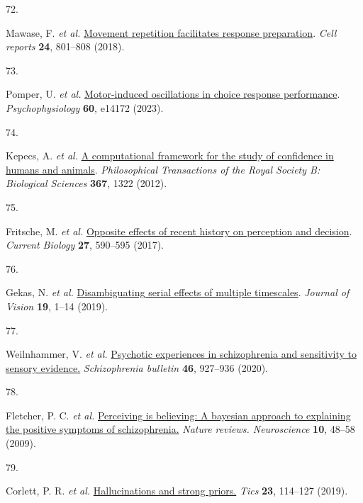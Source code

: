 \documentclass[
]{article}
\newlength{\cslhangindent}
\newlength{\csllabelwidth}
\newlength{\cslentryspacingunit} %
\newenvironment{CSLReferences}[2] %
 {%
  \setlength{\parindent}{0pt}
  \ifodd #1
  \let\oldpar\par
  \def\par{\hangindent=\cslhangindent\oldpar}
  \fi
  \setlength{\parskip}{#2\cslentryspacingunit}
 }%
 {}
\newcommand{\CSLLeftMargin}[1]{\parbox[t]{\csllabelwidth}{#1}}
\newcommand{\CSLRightInline}[1]{\parbox[t]{\linewidth - \csllabelwidth}{#1}\break}
\begin{document}
\begin{CSLReferences}{0}{0}
\leavevmode{}%
\CSLLeftMargin{72. }%
\CSLRightInline{Mawase, F. \emph{et al.}
\href{https://doi.org/10.1016/J.CELREP.2018.06.097}{Movement repetition
facilitates response preparation}. \emph{Cell reports} \textbf{24},
801--808 (2018).}

\leavevmode{}%
\CSLLeftMargin{73. }%
\CSLRightInline{Pomper, U. \emph{et al.}
\href{https://doi.org/10.1111/PSYP.14172}{Motor-induced oscillations in
choice response performance}. \emph{Psychophysiology} \textbf{60},
e14172 (2023).}

\leavevmode{}%
\CSLLeftMargin{74. }%
\CSLRightInline{Kepecs, A. \emph{et al.}
\href{https://doi.org/10.1098/RSTB.2012.0037}{A computational framework
for the study of confidence in humans and animals}. \emph{Philosophical
Transactions of the Royal Society B: Biological Sciences} \textbf{367},
1322 (2012).}

\leavevmode{}%
\CSLLeftMargin{75. }%
\CSLRightInline{Fritsche, M. \emph{et al.}
\href{https://doi.org/10.1016/j.cub.2017.01.006}{Opposite effects of
recent history on perception and decision}. \emph{Current Biology}
\textbf{27}, 590--595 (2017).}

\leavevmode{}%
\CSLLeftMargin{76. }%
\CSLRightInline{Gekas, N. \emph{et al.}
\href{https://doi.org/10.1167/19.6.24}{Disambiguating serial effects of
multiple timescales}. \emph{Journal of Vision} \textbf{19}, 1--14
(2019).}

\leavevmode{}%
\CSLLeftMargin{77. }%
\CSLRightInline{Weilnhammer, V. \emph{et al.}
\href{https://www.ncbi.nlm.nih.gov/pubmed/32090246}{Psychotic
experiences in schizophrenia and sensitivity to sensory evidence.}
\emph{Schizophrenia bulletin} \textbf{46}, 927--936 (2020).}

\leavevmode{}%
\CSLLeftMargin{78. }%
\CSLRightInline{Fletcher, P. C. \emph{et al.}
\href{https://doi.org/10.1038/nrn2536}{Perceiving is believing: A
bayesian approach to explaining the positive symptoms of schizophrenia.}
\emph{Nature reviews. Neuroscience} \textbf{10}, 48--58 (2009).}

\leavevmode{}%
\CSLLeftMargin{79. }%
\CSLRightInline{Corlett, P. R. \emph{et al.}
\href{https://doi.org/10.1016/j.tics.2018.12.001}{Hallucinations and
strong priors.} \emph{Tics} \textbf{23}, 114--127 (2019).}


\end{CSLReferences}
\end{document}

